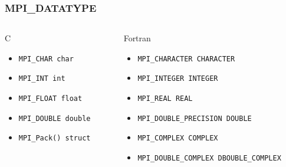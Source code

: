 \documentclass{beamer}
\begin{document}
\begin{frame}[fragile]
 \frametitle{MPI\_DATATYPE}
  \begin{columns}[T]
   \begin{column}{5cm}
    \begin{block}{C}
     \begin{itemize}
      \item \texttt{MPI\_CHAR char}
      \item \texttt{MPI\_INT int}
      \item \texttt{MPI\_FLOAT float}
      \item \texttt{MPI\_DOUBLE double}
      \item \texttt{MPI\_Pack() struct}
     \end{itemize}
    \end{block}
   \end{column}
   \begin{column}{5cm}
    \begin{block}{Fortran}
     \begin{itemize}
      \item \texttt{MPI\_CHARACTER CHARACTER}
      \item \texttt{MPI\_INTEGER INTEGER}
      \item \texttt{MPI\_REAL REAL}
      \item \texttt{MPI\_DOUBLE\_PRECISION DOUBLE}
      \item \texttt{MPI\_COMPLEX COMPLEX}
      \item \texttt{MPI\_DOUBLE\_COMPLEX DBOUBLE\_COMPLEX}
     \end{itemize}
    \end{block}
   \end{column}
  \end{columns}
\end{frame}
\end{document}
